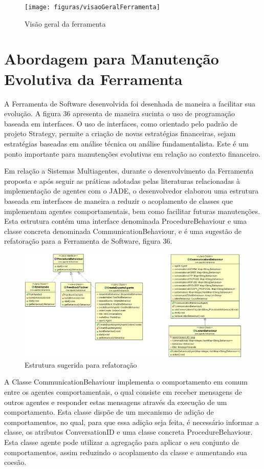 \begin{figure}[h!]
\centering
\label{f30}
\texttt{[image: figuras/visaoGeralFerramenta]}
\caption{Visão geral da ferramenta}
\end{figure}
\FloatBarrier


\section{Abordagem para Manutenção Evolutiva da Ferramenta}

A Ferramenta de Software desenvolvida foi desenhada de maneira a facilitar sua evolução. A figura 36 apresenta de maneira sucinta o uso de programação baseada em interfaces. O uso de interfaces, como orientado pelo padrão de projeto Strategy, permite a criação de novas estratégias financeiras, sejam estratégias baseadas em análise técnica ou análise fundamentalista. Este é um ponto importante para manutenções evolutivas em relação ao contexto financeiro.

Em relação a Sistemas Multiagentes, durante o desenvolvimento da Ferramenta proposta e após seguir as práticas adotadas pelas literaturas relacionadas à implementação de agentes com o JADE, o desenvolvedor elaborou uma estrutura baseada em interfaces de maneira a reduzir o acoplamento de classes que implementam agentes comportamentais, bem como facilitar futuras manutenções. Esta estrutura contém uma interface denominada ProcedureBehaviour e uma classe concreta denominada CommunicationBehaviour, e é uma sugestão de refatoração para a Ferramenta de Software, figura 36.

\begin{figure}[h!]
\centering
\label{f31}
\includegraphics[width=1\textwidth]{figuras/pacoteBehaviours}
\caption{Estrutura sugerida para refatoração}
\end{figure}
\FloatBarrier

A Classe CommunicationBehaviour implementa o comportamento em comum entre os agentes comportamentais, o qual consiste em receber mensagens de outros agentes e responder estas mensagens através da execução de um comportamento. Esta classe dispõe de um mecanismo de adição de comportamentos, no qual, para que essa adição seja feita, é necessário informar a classe, os atributos ConversationID e uma classe concreta ProcedureBehaviour. Esta classe agente pode utilizar a agregação para aplicar o seu conjunto de comportamentos, assim reduzindo o acoplamento da classe e aumentando sua coesão.

